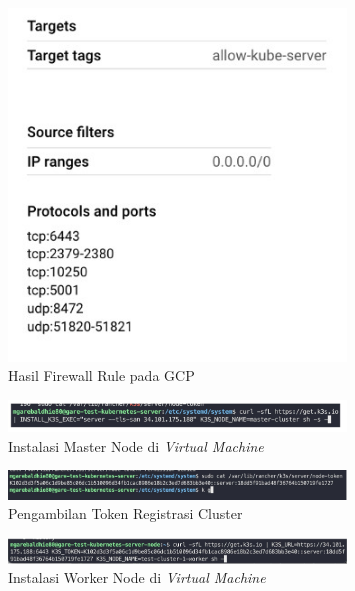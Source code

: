 \begin{figure}[ht]
  \centering
  \includegraphics[width=0.8\textwidth]{resources/chapter-4/pengujian/kube-gcp-02.jpg}
  \caption{Hasil Firewall Rule pada GCP}
  \label{fig:hasil-firewall-rule-pada-gcp}
\end{figure}

\begin{figure}[ht]
  \centering
  \includegraphics[width=0.8\textwidth]{resources/chapter-4/pengujian/kube-gcp-04.jpg}
  \caption{Instalasi Master Node di \textit{Virtual Machine}}
  \label{fig:instalasi-master-node-gcp}
\end{figure}

\begin{figure}[ht]
  \centering
  \includegraphics[width=0.8\textwidth]{resources/chapter-4/pengujian/kube-gcp-05.jpg}
  \caption{Pengambilan Token Registrasi Cluster}
  \label{fig:pengambilan-token-registrasi-cluster}
\end{figure}

\begin{figure}[ht]
  \centering
  \includegraphics[width=0.8\textwidth]{resources/chapter-4/pengujian/kube-gcp-06.jpg}
  \caption{Instalasi Worker Node di \textit{Virtual Machine}}
  \label{fig:instalasi-worker-node-gcp}
\end{figure}

